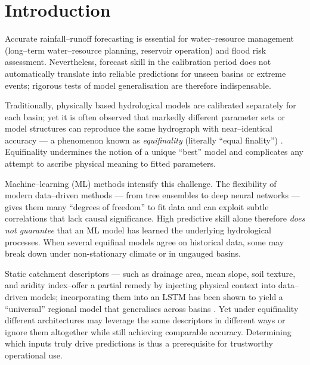 \section{Introduction}
\label{sec:introduction}

Accurate rainfall--runoff forecasting is essential for water--resource management (long--term water--resource planning, reservoir operation) and flood risk assessment. Nevertheless, forecast skill in the calibration period does not automatically translate into reliable predictions for unseen basins or extreme events; rigorous tests of model generalisation are therefore indispensable.

Traditionally, physically based hydrological models are calibrated separately for each basin; yet it is often observed  that markedly different parameter sets or model structures can reproduce the same hydrograph with near--identical accuracy --- a phenomenon known as \emph{equifinality} (literally ``equal finality'') \cite{bevenFutureDistributedModels1992a, freerBayesianEstimationUncertainty1996}. Equifinality undermines the notion of a unique ``best'' model and complicates any attempt to ascribe physical meaning to fitted parameters.

Machine--learning (ML) methods intensify this challenge. The flexibility of modern data--driven methods --- from tree ensembles to deep neural networks --- gives them many ``degrees of freedom'' to fit data and can exploit subtle correlations that lack causal significance. High predictive skill alone therefore \emph{does not guarantee} that an ML model has learned the underlying hydrological processes. When several equifinal models agree on historical data, some may break down under non-stationary climate or in ungauged basins.

Static catchment descriptors --- such as drainage area, mean slope, soil texture, and aridity index--offer a partial remedy by injecting physical context into data--driven models; incorporating them into an LSTM has been shown to yield a ``universal'' regional model that generalises across basins \cite{kratzertLearningUniversalRegional2019}. Yet under equifinality different architectures may leverage the same descriptors in different ways or ignore them altogether while still achieving comparable accuracy. Determining which inputs truly drive predictions is thus a prerequisite for trustworthy operational use.

